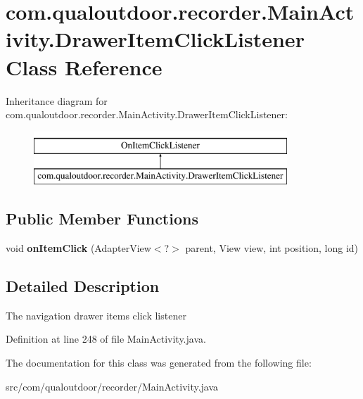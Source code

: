 \hypertarget{classcom_1_1qualoutdoor_1_1recorder_1_1MainActivity_1_1DrawerItemClickListener}{\section{com.\-qualoutdoor.\-recorder.\-Main\-Activity.\-Drawer\-Item\-Click\-Listener Class Reference}
\label{classcom_1_1qualoutdoor_1_1recorder_1_1MainActivity_1_1DrawerItemClickListener}
}
Inheritance diagram for com.\-qualoutdoor.\-recorder.\-Main\-Activity.\-Drawer\-Item\-Click\-Listener\-:\begin{figure}[H]
\begin{center}
\leavevmode
\includegraphics[height=2.000000cm]{classcom_1_1qualoutdoor_1_1recorder_1_1MainActivity_1_1DrawerItemClickListener}
\end{center}
\end{figure}
\subsection*{Public Member Functions}
\begin{DoxyCompactItemize}
\item 
\hypertarget{classcom_1_1qualoutdoor_1_1recorder_1_1MainActivity_1_1DrawerItemClickListener_af8d7abb968131246e1ebafdacde9a9b4}{void {\bfseries on\-Item\-Click} (Adapter\-View$<$?$>$ parent, View view, int position, long id)}\label{classcom_1_1qualoutdoor_1_1recorder_1_1MainActivity_1_1DrawerItemClickListener_af8d7abb968131246e1ebafdacde9a9b4}

\end{DoxyCompactItemize}


\subsection{Detailed Description}
The navigation drawer items click listener 

Definition at line 248 of file Main\-Activity.\-java.



The documentation for this class was generated from the following file\-:\begin{DoxyCompactItemize}
\item 
src/com/qualoutdoor/recorder/Main\-Activity.\-java\end{DoxyCompactItemize}
